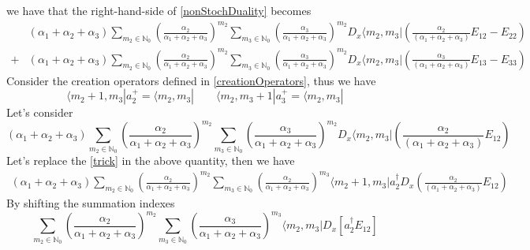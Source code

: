\documentclass[11pt]{article}
\numberwithin{equation}{subsection}
\begin{document}
we have that the right-hand-side of \eqref{nonStochDuality} becomes
\begin{equation}\label{stepTrick}
\begin{split}
&(\alpha_{1}+\alpha_{2}+\alpha_{3})\sum_{m_{2}\in\mathbb{N}_{0}}	\left(\frac{\alpha_{2}}{\alpha_{1}+\alpha_{2}+\alpha_{3}}\right)^{m_{2}}\sum_{m_{3}\in \mathbb{N}_{0}}\left(\frac{\alpha_{3}}{\alpha_{1}+\alpha_{2}+\alpha_{3}}\right)^{m_{2}}D_{x}\langle m_{2},m_{3}|\left(\frac{\alpha_{2}}{(\alpha_{1}+\alpha_{2}+\alpha_{3})}E_{12}-E_{22}\right)
\\+&
(\alpha_{1}+\alpha_{2}+\alpha_{3})\sum_{m_{2}\in\mathbb{N}_{0}}	\left(\frac{\alpha_{2}}{\alpha_{1}+\alpha_{2}+\alpha_{3}}\right)^{m_{2}}\sum_{m_{3}\in \mathbb{N}_{0}}\left(\frac{\alpha_{3}}{\alpha_{1}+\alpha_{2}+\alpha_{3}}\right)^{m_{2}}D_{x}\langle m_{2},m_{3}|\left(\frac{\alpha_{3}}{(\alpha_{1}+\alpha_{2}+\alpha_{3})}E_{13}-E_{33}\right)
\end{split}
\end{equation}
Consider the creation operators defined in \eqref{creationOperators}, thus we have
\begin{equation}\label{trick}
	\langle m_{2}+1,m_{3}|a_{2}^{+}=\langle m_{2},m_{3}|\qquad	\langle m_{2}, m_{3}+1|a_{3}^{+}=\langle m_{2},m_{3}|
\end{equation}
Let's consider 
\begin{equation}
    (\alpha_{1}+\alpha_{2}+\alpha_{3})\sum_{m_{2}\in\mathbb{N}_{0}}	\left(\frac{\alpha_{2}}{\alpha_{1}+\alpha_{2}+\alpha_{3}}\right)^{m_{2}}\sum_{m_{3}\in \mathbb{N}_{0}}\left(\frac{\alpha_{3}}{\alpha_{1}+\alpha_{2}+\alpha_{3}}\right)^{m_{2}}D_{x}\langle m_{2},m_{3}|\left(\frac{\alpha_{2}}{(\alpha_{1}+\alpha_{2}+\alpha_{3})}E_{12}\right)
\end{equation}
Let's replace the \eqref{trick} in the above quantity, then we have
\begin{equation}
\begin{split}
(\alpha_{1}+\alpha_{2}+\alpha_{3})\sum_{m_{2}\in\mathbb{N}_{0}}	\left(\frac{\alpha_{2}}{\alpha_{1}+\alpha_{2}+\alpha_{3}}\right)^{m_{2}}\sum_{m_{3}\in \mathbb{N}_{0}}\left(\frac{\alpha_{2}}{\alpha_{1}+\alpha_{2}+\alpha_{3}}\right)^{m_{3}}\langle m_{2}+1,m_{3}|a_{2}^{\dagger}D_{x}\left(\frac{\alpha_{2}}{(\alpha_{1}+\alpha_{2}+\alpha_{3})}E_{12}\right)
\end{split}
\end{equation}
By shifting the summation indexes 
\begin{equation}\label{trick1}
\sum_{m_{2}\in\mathbb{N}_{0}}	\left(\frac{\alpha_{2}}{\alpha_{1}+\alpha_{2}+\alpha_{3}}\right)^{m_{2}}\sum_{m_{3}\in \mathbb{N}_{0}}\left(\frac{\alpha_{3}}{\alpha_{1}+\alpha_{2}+\alpha_{3}}\right)^{m_{3}}\langle m_{2},m_{3}|D_{x}\left[a_{2}^{\dagger}E_{12}\right]
\end{equation}
\end{document}
